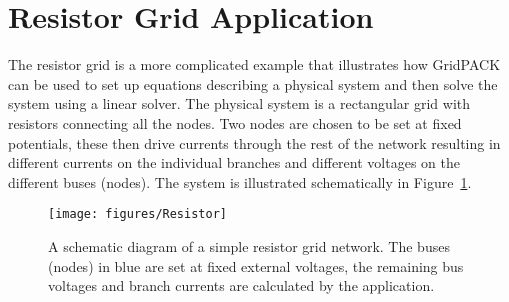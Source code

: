 \section{Resistor Grid Application}

The resistor grid is a more complicated example that illustrates how GridPACK
can be used to set up equations describing a physical system and then solve the
system using a linear solver. The physical system is a rectangular grid with
resistors connecting all the nodes. Two nodes are chosen to be set at fixed
potentials, these then drive currents through the rest of the network resulting
in different currents on the individual branches and different voltages on the
different buses (nodes). The system is illustrated schematically in
Figure~\ref{fig:resistor}.

\begin{figure}
  \centering
    \texttt{[image: figures/Resistor]}
  \caption{A schematic diagram of a simple resistor grid network. The buses (nodes) in blue are set at fixed external voltages, the remaining bus voltages and branch currents are calculated by the application.}
  \label{fig:resistor}
\end{figure}




